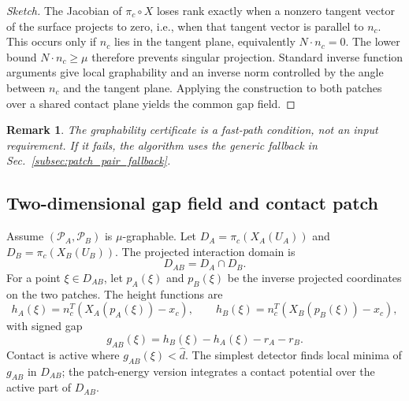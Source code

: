 \documentclass[preprint,12pt]{elsarticle}
\newtheorem{remark}{Remark}
\newcommand{\Pc}{\mathcal{P}}
\begin{document}
\begin{proof}[Sketch]
The Jacobian of $\pi_c\circ X$ loses rank exactly when a nonzero tangent vector of the surface projects to zero, i.e., when that tangent vector is parallel to $n_c$. This occurs only if $n_c$ lies in the tangent plane, equivalently $N\cdot n_c=0$. The lower bound $N\cdot n_c\ge\mu$ therefore prevents singular projection. Standard inverse function arguments give local graphability and an inverse norm controlled by the angle between $n_c$ and the tangent plane. Applying the construction to both patches over a shared contact plane yields the common gap field.
\end{proof}

\begin{remark}
The graphability certificate is a fast-path condition, not an input requirement. If it fails, the algorithm uses the generic fallback in Sec.~\ref{subsec:patch_pair_fallback}.
\end{remark}

\subsection{Two-dimensional gap field and contact patch}
\label{subsec:graph_gap}

Assume $(\Pc_A,\Pc_B)$ is $\mu$-graphable. Let $D_A=\pi_c(X_A(U_A))$ and $D_B=\pi_c(X_B(U_B))$. The projected interaction domain is
\begin{equation}
    D_{AB}=D_A\cap D_B.
\end{equation}
For a point $\xi\in D_{AB}$, let $p_A(\xi)$ and $p_B(\xi)$ be the inverse projected coordinates on the two patches. The height functions are
\begin{equation}
    h_A(\xi)=n_c^T(X_A(p_A(\xi))-x_c),
    \qquad
    h_B(\xi)=n_c^T(X_B(p_B(\xi))-x_c),
\end{equation}
with signed gap
\begin{equation}
    g_{AB}(\xi)=h_B(\xi)-h_A(\xi)-r_A-r_B.
    \label{eq:graph_gap}
\end{equation}
Contact is active where $g_{AB}(\xi)<\hat d$. The simplest detector finds local minima of $g_{AB}$ in $D_{AB}$; the patch-energy version integrates a contact potential over the active part of $D_{AB}$.
\end{document}
